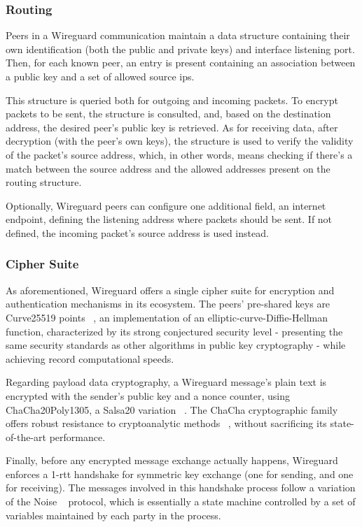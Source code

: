 \documentclass[11pt,twoside,a4paper]{report}
\begin{document}
\subsubsection{Routing}

Peers in a Wireguard communication maintain a data structure containing their own identification (both the public and private keys) and interface listening port. Then, for each known peer, an entry is present containing an association between a public key and a set of allowed source ips.

This structure is queried both for outgoing and incoming packets. To encrypt packets to be sent, the structure is consulted, and, based on the destination address, the desired peer's public key is retrieved. As for receiving data, after decryption (with the peer's own keys), the structure is used to verify the validity of the packet's source address, which, in other words, means checking if there's a match between the source address and the allowed addresses present on the routing structure.

Optionally, Wireguard peers can configure one additional field, an internet endpoint, defining the listening address where packets should be sent. If not defined, the incoming packet's source address is used instead.

\subsubsection{Cipher Suite}

As aforementioned, Wireguard offers a single cipher suite for encryption and authentication mechanisms in its ecosystem. The peers' pre-shared keys are Curve25519 points ~\cite{bernstein2006curve25519}, an implementation of an elliptic-curve-Diffie-Hellman function, characterized by its strong conjectured security level - presenting the same security standards as other algorithms in public key cryptography - while achieving record computational speeds.

Regarding payload data cryptography, a Wireguard message's plain text is encrypted with the sender's public key and a nonce counter, using ChaCha20Poly1305, a Salsa20 variation ~\cite{bernstein2008chacha}. The ChaCha cryptographic family offers robust resistance to cryptoanalytic methods ~\cite{cryptoeprint:2014/613}, without sacrificing its state-of-the-art performance.

Finally, before any encrypted message exchange actually happens, Wireguard enforces a 1-\ac{rtt} handshake for symmetric key exchange (one for sending, and one for receiving). The messages involved in this handshake process follow a variation of the Noise ~\cite{perrin2018noise} protocol, which is essentially a state machine controlled by a set of variables maintained by each party in the process.
\end{document}
